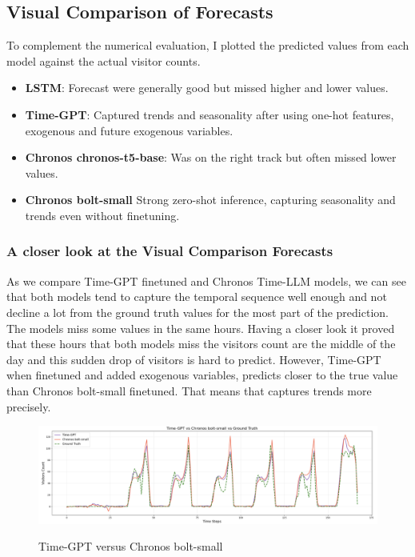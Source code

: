 \documentclass{article}
\begin{document}
\subsection{Visual Comparison of Forecasts}
To complement the numerical evaluation, I plotted the predicted values from each model against the actual visitor counts.

\begin{itemize}
    \item \textbf{LSTM}: Forecast were generally good but missed higher and lower values.
\end{itemize}

\begin{itemize}
    \item \textbf{Time-GPT}: Captured trends and seasonality after using one-hot features, exogenous and future exogenous variables.
\end{itemize}

\begin{itemize}
    \item \textbf{Chronos chronos-t5-base}: Was on the right track but often missed lower values.
\end{itemize}

\begin{itemize}
    \item \textbf{Chronos bolt-small} Strong zero-shot inference, capturing seasonality and trends even without finetuning.
\end{itemize}

\subsubsection*{A closer look at the Visual Comparison Forecasts}
As we compare Time-GPT finetuned and Chronos Time-LLM models, we can see that both models tend to capture the temporal sequence well enough and not decline a lot from the ground truth values for the most part of the prediction. The models miss some values in the same hours. Having a closer look it proved that these hours that both models miss the visitors count are the middle of the day and this sudden drop of visitors is hard to predict. However, Time-GPT when finetuned and added exogenous variables, predicts closer to the true value than Chronos bolt-small finetuned. That means that captures trends more precisely.

 \begin{figure}[h]
\includegraphics[width=1\linewidth]{images/timegpt_versus_bolt.png}
    \label{fig:mesh1}
    \caption{Time-GPT versus Chronos bolt-small}
\end{figure}
\end{document}
